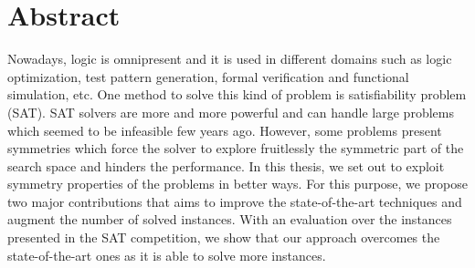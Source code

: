 
\chapter*{Abstract}
Nowadays, logic is omnipresent and it is used in different domains such as logic optimization, test pattern generation, formal verification and functional simulation, etc.
One method to solve this kind of problem is satisfiability problem (SAT).
SAT solvers are more and more powerful and can handle large problems which seemed to be infeasible 
few years ago. However, some problems present symmetries which force the solver to explore fruitlessly
the symmetric part of the search space and hinders the performance. 
In this thesis, we set out to exploit symmetry properties of the problems in better ways.
For this purpose, we propose two major contributions that aims to improve the state-of-the-art techniques and augment the number of solved instances. With an evaluation over the instances presented in the SAT competition, we show that our approach overcomes the state-of-the-art ones as it is able to solve more instances. 